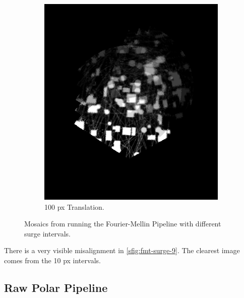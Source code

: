 \begin{figure}[H]
\begin{subfigure}[b]{0.47\textwidth}
        \includegraphics[width=\textwidth]{figures/results/Translation-Surge-Combined/FMT-9.png}
        \caption{100 px Translation.}
        \label{sfig:fmt-surge-9}
    \end{subfigure}
    \hfill
    \caption{Mosaics from running the Fourier-Mellin Pipeline with different surge intervals.}
\end{figure}

There is a very visible misalignment in \autoref{sfig:fmt-surge-9}. The clearest image comes from the 10 px intervals.

\subsection{Raw Polar Pipeline}
\label{sec:surge-hurtos}

